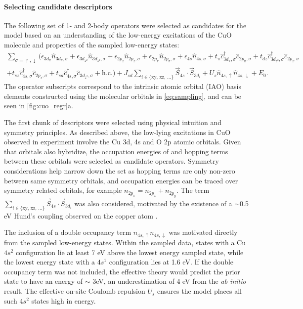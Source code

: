 \documentclass[12pt]{article}
\begin{document}
\paragraph{Selecting candidate descriptors}
The following set of 1- and 2-body operators were selected as candidates for the model based on an understanding of the low-energy excitations of the CuO molecule and properties of the sampled low-energy states:
\begin{equation}
\begin{split}
\sum_{\sigma = \uparrow, \downarrow} \Bigg(\epsilon_{3d_\pi}\hat{n}_{3d_\pi,\sigma} + \epsilon_{3d_{z^2}}\hat{n}_{3d_{z^2},\sigma} +  \epsilon_{2p_z} \hat{n}_{2p_z,\sigma} + \epsilon_{2p_\pi}\hat{n}_{2p_\pi,\sigma} + \epsilon_{4s}\hat{n}_{4s,\sigma} +
t_\pi \hat{c}_{3d_\pi,\sigma}^\dagger \hat{c}_{2p_\pi,\sigma} + t_{dz} \hat{c}_{3d_{z^2},\sigma}^\dagger \hat{c}_{2p_z,\sigma}\\
  + t_{sz}\hat{c}_{4s,\sigma}^\dagger \hat{c}_{2p_z,\sigma} + t_{sd}\hat{c}_{4s,\sigma}^\dagger \hat{c}_{3d_{z^2},\sigma} + \text{h.c.} \Bigg)  +
J_{sd}\sum_{i\in {\{\text{xy, xz, ...}}\}} \vec{S}_{4s} \cdot \vec{S}_{3d_i} + U_s \hat{n}_{4s,\uparrow}\hat{n}_{4s,\downarrow} + E_0.
\end{split}
\label{eq:models}
\end{equation}
The operator subscripts correspond to the intrinsic atomic orbital (IAO) basis elements constructed using the molecular orbitals in \eqref{eq:sampling}, and can be seen in \ref{fig:cuo_regr}a.

The first chunk of descriptors were selected using physical intuition and symmetry principles.
As described above, the low-lying excitations in CuO observed in experiment involve the Cu 3d, 4s and O 2p atomic orbitals.
Given that orbitals also hybridize, the occupation energies of and hopping terms between these orbitals were selected as candidate operators.
Symmetry considerations help narrow down the set as hopping terms are only non-zero between same symmetry orbitals, and occupation energies can be traced over symmetry related orbitals, for example $n_{2p_\pi} = n_{2p_x} + n_{2p_y}$.
The term $\sum_{i\in {\{\text{xy, xz, ...}}\}} \vec{S}_{4s} \cdot \vec{S}_{3d_i}$ was also considered, motivated by the existence of a $\sim $0.5 eV Hund's coupling observed on the copper atom \cite{Data2009}.

The inclusion of a double occupancy term $n_{4s,\uparrow} n_{4s,\downarrow}$ was motivated directly from the sampled low-energy states.
Within the sampled data, states with a Cu $4s^{2}$ configuration lie at least 7 eV above the lowest energy sampled state, while the lowest energy state with a $4s^{1}$ configuration lies at 1.6 eV.
If the double occupancy term was not included, the effective theory would predict the prior state to have an energy of $\sim $ 3eV, an underestimation of 4 eV from the \textit{ab initio} result.
The effective on-site Coulomb repulsion $U_s$ ensures the model places all such $4s^{2}$ states high in energy.
\end{document}
